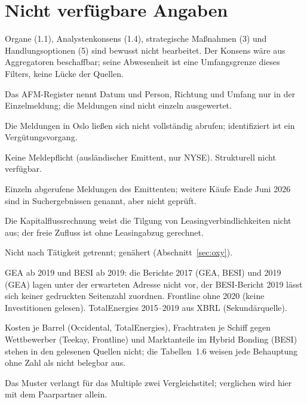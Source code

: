 \section*{Nicht verf\"ugbare Angaben}
\label{sec:luecken}

\begin{description}\small
\item[Umfang.] Organe (1.1), Analystenkonsens (1.4), strategische Ma{\ss}nahmen (3) und
  Handlungsoptionen (5) sind bewusst nicht bearbeitet. Der Konsens w\"are aus Aggregatoren
  beschaffbar; seine Abwesenheit ist eine Umfangsgrenze dieses Filters, keine L\"ucke der
  Quellen.
\item[Directors' Dealings BESI.] Das AFM-Register nennt Datum und Person, Richtung und
  Umfang nur in der Einzelmeldung; die \BesiDdMeldungen{} Meldungen sind nicht einzeln
  ausgewertet.
\item[Directors' Dealings Frontline.] Die Meldungen in Oslo lie{\ss}en sich nicht
  vollst\"andig abrufen; identifiziert ist ein Verg\"utungsvorgang.
\item[Directors' Dealings Teekay Tankers.] Keine Meldepflicht (ausl\"andischer Emittent,
  nur NYSE). Strukturell nicht verf\"ugbar.
\item[Directors' Dealings GEA.] Einzeln abgerufene Meldungen des Emittenten; weitere K\"aufe
  Ende Juni 2026 sind in Suchergebnissen genannt, aber nicht gepr\"uft.
\item[Leasing TotalEnergies.] Die Kapitalflussrechnung weist die Tilgung von
  Leasingverbindlichkeiten nicht aus; der freie Zufluss ist ohne Leasingabzug gerechnet.
\item[Investitionen Occidental ohne OxyChem.] Nicht nach T\"atigkeit getrennt; gen\"ahert
  (Abschnitt~\ref{sec:oxy}).
\item[Reihen.] GEA ab 2019 und BESI ab 2019: die Berichte 2017 (GEA, BESI) und 2019 (GEA)
  lagen unter der erwarteten Adresse nicht vor, der BESI-Bericht 2019 l\"asst sich keiner
  gedruckten Seitenzahl zuordnen. Frontline ohne 2020 (keine Investitionen gelesen).
  TotalEnergies 2015--2019 aus XBRL (Sekund\"arquelle).
\item[Wettbewerbsvorteile.] Kosten je Barrel (Occidental, TotalEnergies), Frachtraten je
  Schiff gegen Wettbewerber (Teekay, Frontline) und Marktanteile im Hybrid Bonding (BESI)
  stehen in den gelesenen Quellen nicht; die Tabellen~1.6 weisen jede Behauptung ohne Zahl
  als nicht belegbar aus.
\item[Peers.] Das Muster verlangt f\"ur das Multiple zwei Vergleichstitel; verglichen wird
  hier mit dem Paarpartner allein.
\end{description}
